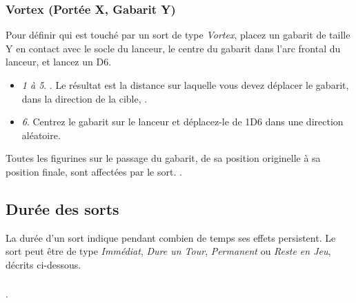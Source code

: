\subsubsection*{Vortex (Portée \unit{X}{\pouce}, Gabarit \unit{Y}{\pouce})}

Pour définir qui est touché par un sort de type \emph{Vortex}, placez un gabarit de taille \unit{Y}{\pouce} en contact avec le socle du lanceur, le centre du gabarit dans l'arc frontal du lanceur, et lancez un D6.
\begin{itemize}[label={-}]
\item \emph{1 à 5}. . Le résultat est la distance sur laquelle vous devez déplacer le gabarit, dans la direction de la cible, .
\item \emph{6}. Centrez le gabarit sur le lanceur et déplacez-le de \unit{1D6}{\pouce} dans une direction aléatoire.
\end{itemize}

Toutes les figurines sur le passage du gabarit, de sa position originelle à sa position finale, sont affectées par le sort. .

\subsection{Durée des sorts}

La durée d'un sort indique pendant combien de temps ses effets persistent. Le sort peut être de type \emph{Immédiat}, \emph{Dure un Tour}, \emph{Permanent} ou \emph{Reste en Jeu}, décrits ci-dessous.

\subsubsection*{}

.

